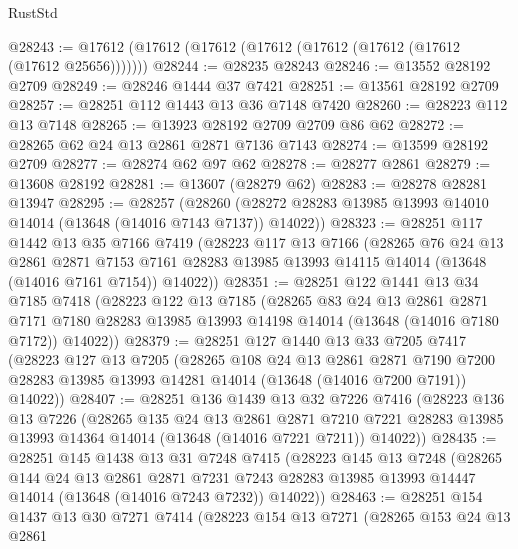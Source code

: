 \begin{lexlean}{RustStd}
\begin{coremodule}
@28243 := @17612 (@17612 (@17612 (@17612 (@17612 (@17612 (@17612 (@17612 @25656)))))))
@28244 := @28235 @28243
@28246 := @13552 @28192 @2709
@28249 := @28246 @1444 @37 @7421
@28251 := @13561 @28192 @2709
@28257 := @28251 @112 @1443 @13 @36 @7148 @7420
@28260 := @28223 @112 @13 @7148
@28265 := @13923 @28192 @2709 @2709 @86 @62
@28272 := @28265 @62 @24 @13 @2861 @2871 @7136 @7143
@28274 := @13599 @28192 @2709
@28277 := @28274 @62 @97 @62
@28278 := @28277 @2861
@28279 := @13608 @28192
@28281 := @13607 (@28279 @62)
@28283 := @28278 @28281 @13947
@28295 := @28257
    (@28260 (@28272 @28283 @13985 @13993 @14010 @14014 (@13648 (@14016 @7143 @7137)) @14022))
@28323 := @28251
    @117
    @1442
    @13
    @35
    @7166
    @7419
    (@28223
      @117
      @13
      @7166
      (@28265
        @76
        @24
        @13
        @2861
        @2871
        @7153
        @7161
        @28283
        @13985
        @13993
        @14115
        @14014
        (@13648 (@14016 @7161 @7154))
        @14022))
@28351 := @28251
    @122
    @1441
    @13
    @34
    @7185
    @7418
    (@28223
      @122
      @13
      @7185
      (@28265
        @83
        @24
        @13
        @2861
        @2871
        @7171
        @7180
        @28283
        @13985
        @13993
        @14198
        @14014
        (@13648 (@14016 @7180 @7172))
        @14022))
@28379 := @28251
    @127
    @1440
    @13
    @33
    @7205
    @7417
    (@28223
      @127
      @13
      @7205
      (@28265
        @108
        @24
        @13
        @2861
        @2871
        @7190
        @7200
        @28283
        @13985
        @13993
        @14281
        @14014
        (@13648 (@14016 @7200 @7191))
        @14022))
@28407 := @28251
    @136
    @1439
    @13
    @32
    @7226
    @7416
    (@28223
      @136
      @13
      @7226
      (@28265
        @135
        @24
        @13
        @2861
        @2871
        @7210
        @7221
        @28283
        @13985
        @13993
        @14364
        @14014
        (@13648 (@14016 @7221 @7211))
        @14022))
@28435 := @28251
    @145
    @1438
    @13
    @31
    @7248
    @7415
    (@28223
      @145
      @13
      @7248
      (@28265
        @144
        @24
        @13
        @2861
        @2871
        @7231
        @7243
        @28283
        @13985
        @13993
        @14447
        @14014
        (@13648 (@14016 @7243 @7232))
        @14022))
@28463 := @28251
    @154
    @1437
    @13
    @30
    @7271
    @7414
    (@28223
      @154
      @13
      @7271
      (@28265
        @153
        @24
        @13
        @2861

\end{coremodule}
\end{lexlean}
